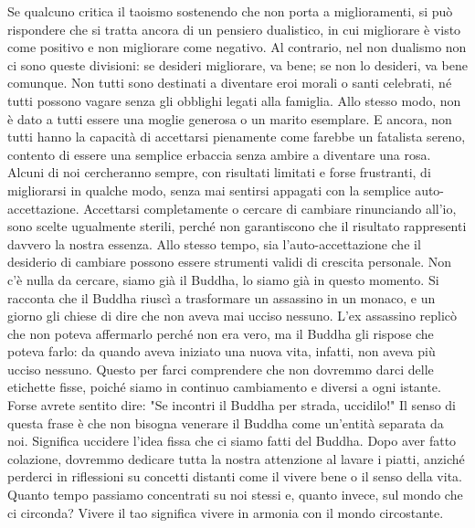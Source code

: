 \documentclass[12pt]{book} %
\begin{document}
Se qualcuno critica il taoismo sostenendo che non porta a miglioramenti, si può rispondere che si tratta ancora di un pensiero dualistico, in cui migliorare è visto come positivo e non migliorare come negativo. Al contrario, nel non dualismo non ci sono queste divisioni: se desideri migliorare, va bene; se non lo desideri, va bene comunque.
Non tutti sono destinati a diventare eroi morali o santi celebrati, né tutti possono vagare senza gli obblighi legati alla famiglia. Allo stesso modo, non è dato a tutti essere una moglie generosa o un marito esemplare. E ancora, non tutti hanno la capacità di accettarsi pienamente come farebbe un fatalista sereno, contento di essere una semplice erbaccia senza ambire a diventare una rosa. Alcuni di noi cercheranno sempre, con risultati limitati e forse frustranti, di migliorarsi in qualche modo, senza mai sentirsi appagati con la semplice auto-accettazione. Accettarsi completamente o cercare di cambiare rinunciando all'io, sono scelte ugualmente sterili, perché non garantiscono che il risultato rappresenti davvero la nostra essenza.
Allo stesso tempo, sia l’auto-accettazione che il desiderio di cambiare possono essere strumenti validi di crescita personale.
Non c'è nulla da cercare, siamo già il Buddha, lo siamo già in questo momento.
Si racconta che il Buddha riuscì a trasformare un assassino in un monaco, e un giorno gli chiese di dire che non aveva mai ucciso nessuno. L'ex assassino replicò che non poteva affermarlo perché non era vero, ma il Buddha gli rispose che poteva farlo: da quando aveva iniziato una nuova vita, infatti, non aveva più ucciso nessuno. Questo per farci comprendere che non dovremmo darci delle etichette fisse, poiché siamo in continuo cambiamento e diversi a ogni istante.
Forse avrete sentito dire: "Se incontri il Buddha per strada, uccidilo!" Il senso di questa frase è che non bisogna venerare il Buddha come un’entità separata da noi. Significa uccidere l'idea fissa che ci siamo fatti del Buddha.
Dopo aver fatto colazione, dovremmo dedicare tutta la nostra attenzione al lavare i piatti, anziché perderci in riflessioni su concetti distanti come il vivere bene o il senso della vita. Quanto tempo passiamo concentrati su noi stessi e, quanto invece, sul mondo che ci circonda? Vivere il tao significa vivere in armonia con il mondo circostante.
\end{document}
